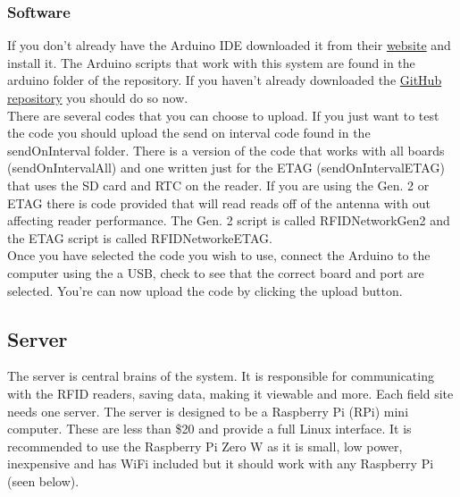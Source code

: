 \documentclass[12pt]{article}
\begin{document}
\subsubsection{Software}
If you don't already have the Arduino IDE downloaded it from their \href{https://www.arduino.cc/en/Main/Software}{website} and install it.  The Arduino scripts that work with this system are found in the arduino folder of the repository.  If you haven't already downloaded the \href{http://github.com/BenSDuggan/RFID-Network}{GitHub repository} you should do so now.\\
There are several codes that you can choose to upload.  If you just want to test the code you should upload the send on interval code found in the sendOnInterval folder.  There is a version of the code that works with all boards (sendOnIntervalAll) and one written just for the ETAG (sendOnIntervalETAG) that uses the SD card and RTC on the reader.  If you are using the Gen. 2 or ETAG there is code provided that will read reads off of the antenna with out affecting reader performance.  The Gen. 2 script is called RFIDNetworkGen2 and the ETAG script is called RFIDNetworkeETAG.\\
Once you have selected the code you wish to use, connect the Arduino to the computer using the a USB, check to see that the correct board and port are selected.  You're can now upload the code by clicking the upload button.\\

\subsection{Server}
The server is central brains of the system.  It is responsible for communicating with the RFID readers, saving data, making it viewable and more.  Each field site needs one server.  The server is designed to be a Raspberry Pi (RPi) mini computer.  These are less than \$20 and provide a full Linux interface.  It is recommended to use the Raspberry Pi Zero W as it is small, low power, inexpensive and has WiFi included but it should work with any Raspberry Pi (seen below).
\end{document}
